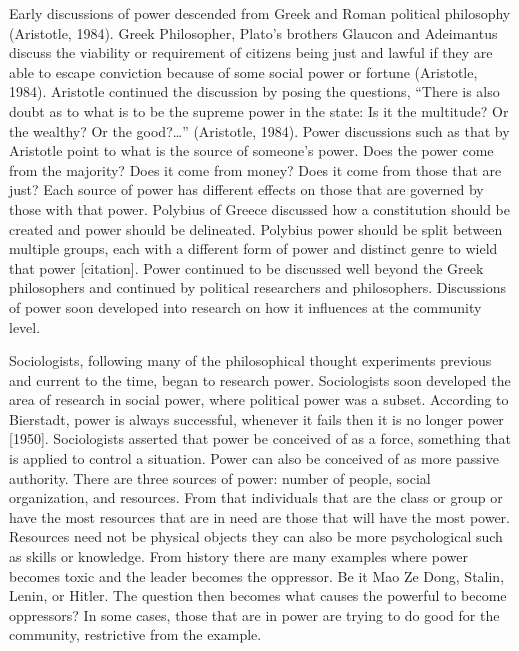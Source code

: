 \documentclass[
  english,
  donotrepeattitle,doc, 12pt, a4paper,floatsintext]{apa7}
\begin{document}
Early discussions of power descended from Greek and Roman political philosophy (Aristotle, 1984). Greek Philosopher, Plato's brothers Glaucon and Adeimantus discuss the viability or requirement of citizens being just and lawful if they are able to escape conviction because of some social power or fortune (Aristotle, 1984). Aristotle continued the discussion by posing the questions, ``There is also doubt as to what is to be the supreme power in the state: Is it the multitude? Or the wealthy? Or the good?\ldots{}'' (Aristotle, 1984). Power discussions such as that by Aristotle point to what is the source of someone's power. Does the power come from the majority? Does it come from money? Does it come from those that are just? Each source of power has different effects on those that are governed by those with that power. Polybius of Greece discussed how a constitution should be created and power should be delineated. Polybius power should be split between multiple groups, each with a different form of power and distinct genre to wield that power {[}citation{]}. Power continued to be discussed well beyond the Greek philosophers and continued by political researchers and philosophers. Discussions of power soon developed into research on how it influences at the community level.

Sociologists, following many of the philosophical thought experiments previous and current to the time, began to research power. Sociologists soon developed the area of research in social power, where political power was a subset. According to Bierstadt, power is always successful, whenever it fails then it is no longer power {[}1950{]}. Sociologists asserted that power be conceived of as a force, something that is applied to control a situation. Power can also be conceived of as more passive authority. There are three sources of power: number of people, social organization, and resources. From that individuals that are the class or group or have the most resources that are in need are those that will have the most power. Resources need not be physical objects they can also be more psychological such as skills or knowledge. From history there are many examples where power becomes toxic and the leader becomes the oppressor. Be it Mao Ze Dong, Stalin, Lenin, or Hitler. The question then becomes what causes the powerful to become oppressors? In some cases, those that are in power are trying to do good for the community, restrictive from the example.
\end{document}

